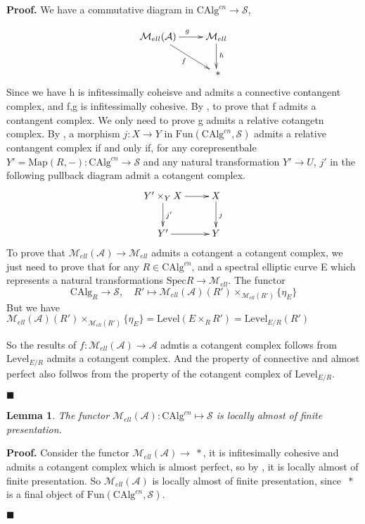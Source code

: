 \documentclass[12pt]{article}
\newtheorem{lemma}[theorem]{Lemma}
\theoremstyle{thry}
\renewenvironment{proof}
{\par \noindent \textbf{Proof.}}
{ \par \hfill $\blacksquare$ \quad \par }
\def  \CAlg     {\mathrm{CAlg}}
\def  \Fun      {\mathrm{Fun}}
\def  \Level    {\mathrm{Level}}
\def  \Map      {\mathrm{Map}}
\def  \Spec     {\mathrm{Spec}}
\def  \ca       {\mathcal{A}}
\def  \cm       {\mathcal{M}}
\def  \cs       {\mathcal{S}}
\begin{document}
\begin{proof}
	We have a commutative diagram in $\CAlg^{cn} \to \cs$,
	
	$$
	\xymatrix{
		\cm_{ell}(\ca)  \ar[r]^{g} \ar[rd]_{f}  &  \cm_{ell}  \ar[d]^{h} \\
		&   \ *   \\
	}
	$$
	Since we have h is infitessimally coheisve and admits a connective  contangent complex, and f,g is infitessimally cohesive. By \cite[Proposition 17.3.9.1]{lu-SAG}, to prove that f admits a contangent complex. We only need to prove g  admits a relative cotangetn complex. By \cite[Proposition 17.2.5.7]{lu-SAG}, a morphism $j:X \to Y$  in $\Fun(\CAlg^{cn},\cs)$ admits a relative contangent complex if and only if, for any corepresentbale $Y'= \Map(R,-): \CAlg^{cn} \to \cs$ and any natural transformation $Y' \to U$,   $j'$ in the following pullback diagram admit a cotangent complex.
	$$
	\xymatrix{
		Y' \times_Y  X  \ar[d]^{j'}  \ar[r]   &   X \ar[d]^{j}  \\
		Y'  \ar[r]      &         Y \\
	}
	$$
	To prove that  $\cm_{ell}(\ca) \to \cm_{ell}$ admits a cotangent a cotangent complex, we just need to prove that for any $R \in \CAlg^{cn}$, and a spectral elliptic curve E which represents a natural transformations $\Spec R  \to \cm_{ell}$. The functor
	$$
	\CAlg_R \to \cs, \quad   R' \mapsto  \cm_{ell}(\ca)(R') \times_{\cm_{ell}(R')} \{\eta_E\}
	$$
	But we have $\cm_{ell}(\ca)(R') \times_{\cm_{ell}(R')} \{\eta_E\}= \Level(E \times_R R') = \Level_{E/R}(R')$
	
	So  the results of $f: \cm_{ell}(\ca) \to \ca$  admtis a cotangent complex  follows from $\Level_{E/R}$ admits a cotangent complex. And the property of connective and almost perfect also follwos from the property of the cotangent complex of $\Level_{E/R}$. 
\end{proof}





\begin{lemma}
	The functor $\cm_{ell}(\ca): \CAlg^{cn}  \mapsto  \cs$ is locally almost of finite presentation.
\end{lemma}


\begin{proof}
	Consider the functor $\cm_{ell}(\ca) \to \ * $, it is infitesimally cohesive and admits a cotangent complex which is almost perfect, so by \cite[17.4.2.2]{lu-SAG}, it is locally almost of finite presentation. So $\cm_{ell}(\ca)$ is locally almost of finite presentation, since $\ *$ is a final object of $\Fun(\CAlg^{cn}, \cs)$. 
	
\end{proof}
\end{document}

